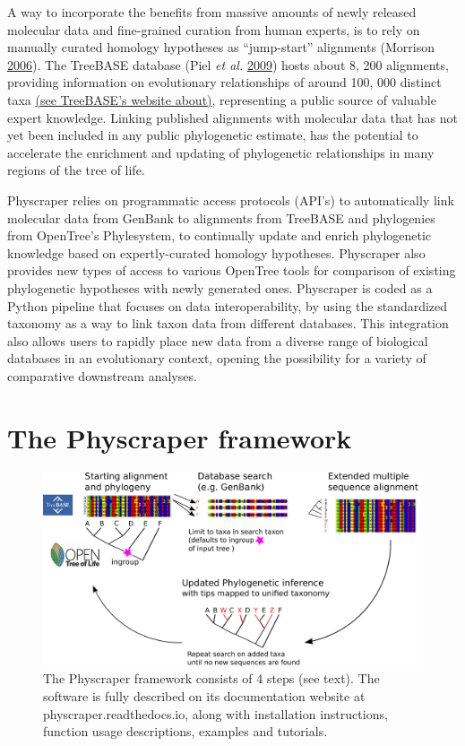 \documentclass[]{article}
\begin{document}
A way to incorporate the benefits from massive amounts of newly released molecular data and fine-grained curation from human experts, is to rely on manually curated homology hypotheses as ``jump-start'' alignments (Morrison \protect\hyperlink{ref-morrison2006multiple}{2006}). The TreeBASE database (Piel \emph{et al.} \protect\hyperlink{ref-piel2009treebase}{2009}) hosts about 8, 200 alignments, providing information on evolutionary relationships of around 100, 000 distinct taxa \href{https://www.treebase.org/treebase-web/home.html\#:~:text=TreeBASE\%20is\%20produced\%20and\%20governed,mapped\%20to\%20104\%2C593\%20distinct\%20taxa.}{(see TreeBASE's website about)}, representing a public source of valuable expert knowledge. Linking published alignments with molecular data that has not yet been included in any public phylogenetic estimate, has the potential to accelerate the enrichment and updating of phylogenetic relationships in many regions of the tree of life.

Physcraper relies on programmatic access protocols (API's) to automatically link molecular data from GenBank to alignments from TreeBASE and phylogenies from OpenTree's Phylesystem, to continually update and enrich phylogenetic knowledge based on expertly-curated homology hypotheses. Physcraper also provides new types of access to various OpenTree tools for comparison of existing phylogenetic hypotheses with newly generated ones.
Physcraper is coded as a Python pipeline that focuses on data interoperability, by using the standardized taxonomy as a way to link taxon data from different databases. This integration also allows users to rapidly place new data from a diverse range of biological databases in an evolutionary context, opening the possibility for a variety of comparative downstream analyses.

\hypertarget{the-physcraper-framework}{%
\section{The Physcraper framework}\label{the-physcraper-framework}}

\begin{figure}

{\centering \includegraphics[width=0.85\linewidth]{docs/figs/schematic} 

}

\caption{The Physcraper framework consists of 4 steps (see text). The software is fully described on its documentation website at physcraper.readthedocs.io, along with installation instructions, function usage descriptions, examples and tutorials.}\label{fig:framework}
\end{figure}
\end{document}
